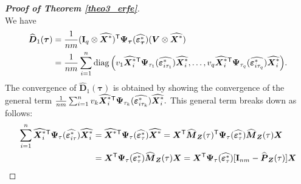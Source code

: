 \documentclass[15pt,a4paper]{article}
\DeclareMathOperator{\diag}{diag}
\newcommand{\transpose}{{}^{\text{\sffamily T}}}
\begin{document}
\begin{proof}[\textbf{Proof of Theorem \ref{theo3_erfe}}]$ $
~~\\
We have 
\begin{equation*}
\begin{split}
\widehat{\boldsymbol{D}}_1(\boldsymbol{\tau})&=\frac{1}{nm}(\mathbf{I}_q\otimes\widehat{\boldsymbol{X}^{*}})\transpose\boldsymbol{\Psi}_{\boldsymbol{\tau}}(
\widehat{\boldsymbol{\varepsilon}_{\boldsymbol{\tau}}^{*}})
(\boldsymbol{V}\otimes \widehat{\boldsymbol{X}^{*}})\\
&=\frac{1}{nm}\sum_{i=1}^{n}\diag\Big(v_1\widehat{\boldsymbol{X}^{*}_i}\transpose\boldsymbol{\Psi}_{\tau_1}(\widehat{\boldsymbol{\varepsilon}^{*}_{i\tau_1}})\widehat{\boldsymbol{X}^{*}_i},\ldots,v_q\widehat{\boldsymbol{X}^{*}_i}\transpose
\boldsymbol{\Psi}_{\tau_q}(\widehat{\boldsymbol{\varepsilon}^{*}_{i\tau_q}})\widehat{\boldsymbol{X}^{*}_i} \Big). \\
\end{split}
\end{equation*}
The convergence of $\widehat{\boldsymbol{D}}_1(\boldsymbol{\tau})$ is obtained by showing the convergence of the general term $\frac{1}{nm}\sum_{i=1}^{n}v_k\widehat{\boldsymbol{X}^{*}_i}\transpose\boldsymbol{\Psi}_{\tau_k}(\widehat{\boldsymbol{\varepsilon}^{*}_{i\tau_k}})\widehat{\boldsymbol{X}^{*}_i}.$  This general term breaks down as follows:
\begin{equation}\label{conv_d1_erfe}
\begin{split}
    \sum_{i=1}^{n}\widehat{\boldsymbol{X}^{*}_i}\transpose\boldsymbol{\Psi}_{\tau}(\widehat{\boldsymbol{\varepsilon}^{*}_{i\tau}})\widehat{\boldsymbol{X}^{*}_i} 
    &= \widehat{\boldsymbol{X}^{*}}\transpose\boldsymbol{\Psi}_{\tau}(\widehat{\boldsymbol{\varepsilon}_{\tau}^{*}}) \widehat{\boldsymbol{X}^{*}} 
     = \boldsymbol{X}\transpose\widehat{\boldsymbol{M}}_{\boldsymbol{Z}}(\tau)\transpose\boldsymbol{\Psi}_{\tau}(\widehat{\boldsymbol{\varepsilon}_{\tau}^{*}})\widehat{\boldsymbol{M}}_{\boldsymbol{Z}}(\tau)\boldsymbol{X}\\
    &= \boldsymbol{X}\transpose\boldsymbol{\Psi}_{\tau}(\widehat{\boldsymbol{\varepsilon}_{\tau}^{*}})\widehat{\boldsymbol{M}}_{\boldsymbol{Z}}(\tau)\boldsymbol{X}
    = \boldsymbol{X}\transpose\boldsymbol{\Psi}_{\tau}(\widehat{\boldsymbol{\varepsilon}_{\tau}^{*}})[\mathbf{I}_{nm}-\widehat{\boldsymbol{P}}_{\boldsymbol{Z}}(\tau)]\boldsymbol{X} \\

\end{split}
\end{equation}
\end{proof}
\end{document}
